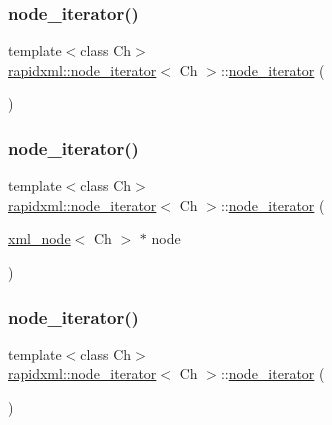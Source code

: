 \subsubsection{\texorpdfstring{node\+\_\+iterator()}{node\_iterator()}\hspace{0.1cm}{\footnotesize\ttfamily [1/4]}}
{\footnotesize\ttfamily template$<$class Ch$>$ \\
\mbox{\hyperlink{classrapidxml_1_1node__iterator}{rapidxml\+::node\+\_\+iterator}}$<$ Ch $>$\+::\mbox{\hyperlink{classrapidxml_1_1node__iterator}{node\+\_\+iterator}} (\begin{DoxyParamCaption}{ }\end{DoxyParamCaption})\hspace{0.3cm}{\ttfamily [inline]}}

\mbox{\label{classrapidxml_1_1node__iterator_a94c3da59b54e4bd003e226cc35b3c266}} 
\subsubsection{\texorpdfstring{node\+\_\+iterator()}{node\_iterator()}\hspace{0.1cm}{\footnotesize\ttfamily [2/4]}}
{\footnotesize\ttfamily template$<$class Ch$>$ \\
\mbox{\hyperlink{classrapidxml_1_1node__iterator}{rapidxml\+::node\+\_\+iterator}}$<$ Ch $>$\+::\mbox{\hyperlink{classrapidxml_1_1node__iterator}{node\+\_\+iterator}} (\begin{DoxyParamCaption}\item[{\mbox{\hyperlink{classrapidxml_1_1xml__node}{xml\+\_\+node}}$<$ Ch $>$ $\ast$}]{node }\end{DoxyParamCaption})\hspace{0.3cm}{\ttfamily [inline]}}

\mbox{\label{classrapidxml_1_1node__iterator_a4e1244b9e9e1d2b5129235806d1e31ad}} 
\subsubsection{\texorpdfstring{node\+\_\+iterator()}{node\_iterator()}\hspace{0.1cm}{\footnotesize\ttfamily [3/4]}}
{\footnotesize\ttfamily template$<$class Ch$>$ \\
\mbox{\hyperlink{classrapidxml_1_1node__iterator}{rapidxml\+::node\+\_\+iterator}}$<$ Ch $>$\+::\mbox{\hyperlink{classrapidxml_1_1node__iterator}{node\+\_\+iterator}} (\begin{DoxyParamCaption}{ }\end{DoxyParamCaption})\hspace{0.3cm}{\ttfamily [inline]}}

